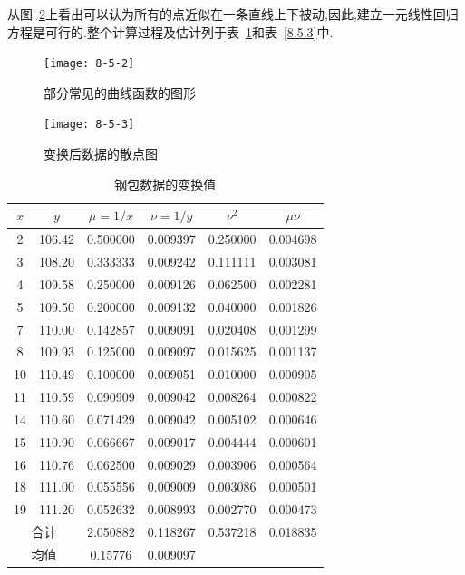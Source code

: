 从图~\ref{fig:8.5.3}上看出可以认为所有的点近似在一条直线上下被动,因此,建立一元线性回归方程是可行的.整个计算过程及估计列于表~\ref{tab:8.5.2}和表~\ref{8.5.3}中.
\begin{figure}[p]
    \centering
    \texttt{[image: 8-5-2]}
    \caption{部分常见的曲线函数的图形}
    \label{fig:8.5.2}
\end{figure}
\begin{figure}[htb]
    \centering
    \texttt{[image: 8-5-3]}
    \caption{变换后数据的散点图}
    \label{fig:8.5.3}
\end{figure}
\begin{table}[htbp]
    \centering
    \caption{钢包数据的变换值}
    \begin{tabular}{cccccc}
        \toprule
     $x$      &  $y$      &  $\mu =1/x$  &  $\nu =1/y$  &  $\nu^2$  &  $\mu\nu$  \\\midrule
        2     & 106.42  & 0.500000  & 0.009397  & 0.250000  & 0.004698  \\
        3     & 108.20  & 0.333333  & 0.009242  & 0.111111  & 0.003081  \\
        4     & 109.58  & 0.250000  & 0.009126  & 0.062500  & 0.002281  \\
        5     & 109.50  & 0.200000  & 0.009132  & 0.040000  & 0.001826  \\
        7     & 110.00  & 0.142857  & 0.009091  & 0.020408  & 0.001299  \\
        8     & 109.93  & 0.125000  & 0.009097  & 0.015625  & 0.001137  \\
        10    & 110.49  & 0.100000  & 0.009051  & 0.010000  & 0.000905  \\
        11    & 110.59  & 0.090909  & 0.009042  & 0.008264  & 0.000822  \\
        14    & 110.60  & 0.071429  & 0.009042  & 0.005102  & 0.000646  \\
        15    & 110.90  & 0.066667  & 0.009017  & 0.004444  & 0.000601  \\
        16    & 110.76  & 0.062500  & 0.009029  & 0.003906  & 0.000564  \\
        18    & 111.00  & 0.055556  & 0.009009  & 0.003086  & 0.000501  \\
        19    & 111.20  & 0.052632  & 0.008993  & 0.002770  & 0.000473  \\
        \multicolumn{2}{c}{合计} & 2.050882  & 0.118267  & 0.537218  & 0.018835  \\
        \multicolumn{2}{c}{均值} & 0.15776 & 0.009097 &       &  \\\bottomrule
    \end{tabular}%
    \label{tab:8.5.2}%
\end{table}%

